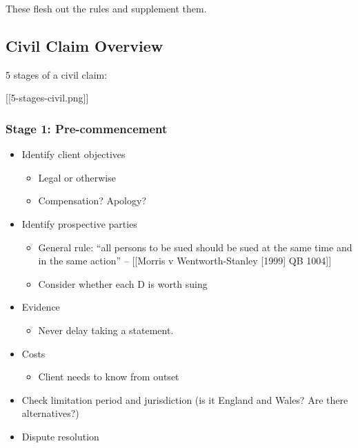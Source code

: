 \documentclass[
]{article}
\providecommand{\tightlist}{%
  \setlength{\itemsep}{0pt}\setlength{\parskip}{0pt}}
\begin{document}
These flesh out the rules and supplement them.

\hypertarget{civil-claim-overview}{%
\subsection{Civil Claim Overview}\label{civil-claim-overview}}

5 stages of a civil claim:

{[}{[}5-stages-civil.png{]}{]}

\hypertarget{stage-1-pre-commencement}{%
\subsubsection{Stage 1:
Pre-commencement}\label{stage-1-pre-commencement}}

\begin{itemize}
\tightlist
\item
  Identify client objectives

  \begin{itemize}
  \tightlist
  \item
    Legal or otherwise
  \item
    Compensation? Apology?
  \end{itemize}
\item
  Identify prospective parties

  \begin{itemize}
  \tightlist
  \item
    General rule: ``all persons to be sued should be sued at the same
    time and in the same action'' -- {[}{[}Morris v Wentworth-Stanley
    {[}1999{]} QB 1004{]}{]}
  \item
    Consider whether each D is worth suing
  \end{itemize}
\item
  Evidence

  \begin{itemize}
  \tightlist
  \item
    Never delay taking a statement.
  \end{itemize}
\item
  Costs

  \begin{itemize}
  \tightlist
  \item
    Client needs to know from outset
  \end{itemize}
\item
  Check limitation period and jurisdiction (is it England and Wales? Are
  there alternatives?)
\item
  Dispute resolution


\end{itemize}
\end{document}
